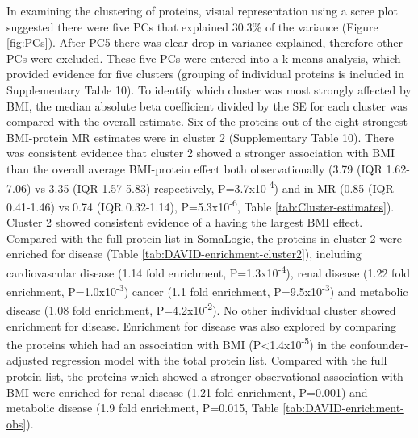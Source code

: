 \documentclass[11pt,twoside]{bristolthesis}
\begin{document}
In examining the clustering of proteins, visual representation using a scree plot suggested there were five PCs that explained 30.3\% of the variance (Figure \ref{fig:PCs}). After PC5 there was clear drop in variance explained, therefore other PCs were excluded. These five PCs were entered into a k-means analysis, which provided evidence for five clusters (grouping of individual proteins is included in Supplementary Table 10). To identify which cluster was most strongly affected by BMI, the median absolute beta coefficient divided by the SE for each cluster was compared with the overall estimate. Six of the proteins out of the eight strongest BMI-protein MR estimates were in cluster 2 (Supplementary Table 10). There was consistent evidence that cluster 2 showed a stronger association with BMI than the overall average BMI-protein effect both observationally (3.79 (IQR 1.62-7.06) vs 3.35 (IQR 1.57-5.83) respectively, P=3.7x10\textsuperscript{-4}) and in MR (0.85 (IQR 0.41-1.46) vs 0.74 (IQR 0.32-1.14), P=5.3x10\textsuperscript{-6}, Table \ref{tab:Cluster-estimates}). Cluster 2 showed consistent evidence of a having the largest BMI effect. Compared with the full protein list in SomaLogic, the proteins in cluster 2 were enriched for disease (Table \ref{tab:DAVID-enrichment-cluster2}), including cardiovascular disease (1.14 fold enrichment, P=1.3x10\textsuperscript{-4}), renal disease (1.22 fold enrichment, P=1.0x10\textsuperscript{-3}) cancer (1.1 fold enrichment, P=9.5x10\textsuperscript{-3}) and metabolic disease (1.08 fold enrichment, P=4.2x10\textsuperscript{-2}). No other individual cluster showed enrichment for disease. Enrichment for disease was also explored by comparing the proteins which had an association with BMI (P\textless1.4x10\textsuperscript{-5}) in the confounder-adjusted regression model with the total protein list. Compared with the full protein list, the proteins which showed a stronger observational association with BMI were enriched for renal disease (1.21 fold enrichment, P=0.001) and metabolic disease (1.9 fold enrichment, P=0.015, Table \ref{tab:DAVID-enrichment-obs}).
\end{document}
